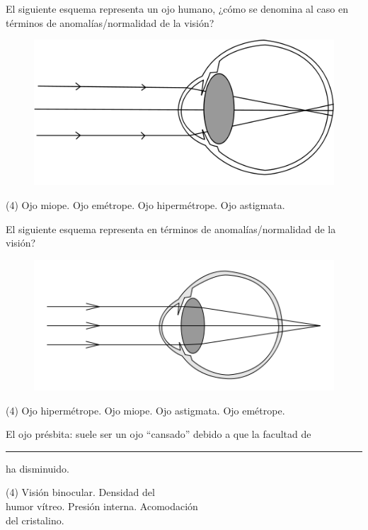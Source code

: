 \documentclass[12pt, letter]{exam}
\begin{document}
\begin{questions}
    \question El siguiente esquema representa un ojo humano, ¿cómo se denomina al caso en términos de anomalías/normalidad de la visión?
    \begin{figure}[H]
        \centering
        \includegraphics[scale=0.3]{Imagenes/Defectos_Vision_03.png}
    \end{figure}
    \begin{tasks}(4)
        \task Ojo miope.
        \task Ojo emétrope.
        \task Ojo hipermétrope.
        \task Ojo astigmata.
    \end{tasks}
    \question El siguiente esquema representa en términos de anomalías/normalidad de la visión?
    \begin{figure}[H]
        \centering
        \includegraphics[scale=0.4]{Imagenes/Defectos_Vision_05.png}
    \end{figure}
    \begin{tasks}(4)
        \task Ojo hipermétrope.
        \task Ojo miope.
        \task Ojo astigmata.
        \task Ojo emétrope.
    \end{tasks}
    \question El ojo présbita: suele ser un ojo \enquote{cansado} debido a que la facultad de \rule{2cm}{0.1mm} ha disminuido.
    \begin{tasks}(4)
        \task Visión binocular.
        \task Densidad del \\ humor vítreo.
        \task Presión interna.
        \task Acomodación \\ del cristalino.

\end{tasks}
\end{questions}
\end{document}
